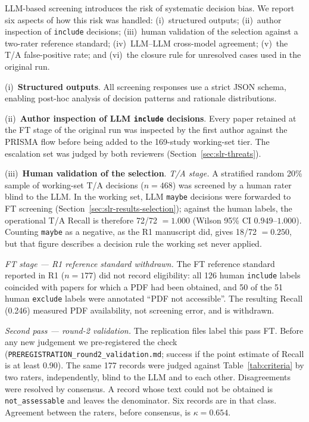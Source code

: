 LLM-based screening introduces the risk of systematic decision bias. We
report six aspects of how this risk was handled: (i)~structured outputs;
(ii)~author inspection of \texttt{include} decisions; (iii)~human
validation of the selection against a two-rater reference standard;
(iv)~LLM--LLM cross-model agreement; (v)~the T/A false-positive rate; and
(vi)~the closure rule for unresolved cases used in the original run.

(i)~\textbf{Structured outputs}. All screening responses use a strict JSON
schema, enabling post-hoc analysis of decision patterns and rationale
distributions.

(ii)~\textbf{Author inspection of LLM \texttt{include} decisions}.
Every paper retained at the FT stage of the original run was inspected by the
first author against the PRISMA flow before being added to the 169-study
working-set tier. The escalation set was judged by both reviewers
(Section~\ref{sec:slr-threats}).

(iii)~\textbf{Human validation of the selection}.
\emph{T/A stage.} A stratified random 20\% sample of working-set T/A
decisions ($n=468$) was screened by a human rater blind to the LLM. In the
working set, LLM \texttt{maybe} decisions were forwarded to FT screening
(Section~\ref{sec:slr-results-selection}); against the human labels, the
operational T/A Recall is therefore 72/72 $=1.000$ (Wilson 95\% CI
$0.949$--$1.000$). Counting \texttt{maybe} as a negative, as the R1
manuscript did, gives 18/72 $=0.250$, but that figure describes a decision
rule the working set never applied.

\emph{FT stage --- R1 reference standard withdrawn.} The FT reference
standard reported in R1 ($n=177$) did not record eligibility: all 126 human
\texttt{include} labels coincided with papers for which a PDF had been
obtained, and 50 of the 51 human \texttt{exclude} labels were annotated
``PDF not accessible''. The resulting Recall (0.246) measured PDF
availability, not screening error, and is withdrawn.

\emph{Second pass --- round-2 validation.} The replication files
label this pass FT. Before any new judgement we
pre-registered the check
(\texttt{PREREGISTRATION\_round2\_validation.md}; success if the point
estimate of Recall is at least 0.90). The same 177 records were judged
against Table~\ref{tab:criteria} by two raters, independently, blind to the
LLM and to each other. Disagreements were resolved by consensus. A record
whose text could not be obtained is \texttt{not\_assessable} and leaves the
denominator. Six records are in that class. Agreement between the raters,
before consensus, is $\kappa = 0.654$.

